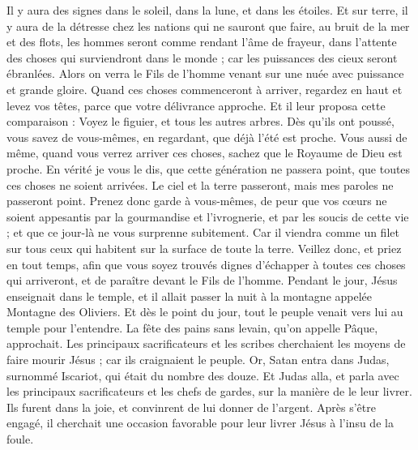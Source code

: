 \begin{multicols}{2}
Il y aura des signes dans le soleil, dans la lune, et dans les étoiles. Et sur terre, il y aura de la détresse chez les nations qui ne sauront que faire, au bruit de la mer et des flots,
les hommes seront comme rendant l'âme de frayeur, dans l'attente des choses qui surviendront dans le monde ; car les puissances des cieux seront ébranlées.
Alors on verra le Fils de l'homme venant sur une nuée avec puissance et grande gloire.
Quand ces choses commenceront à arriver, regardez en haut et levez vos têtes, parce que votre délivrance approche.
Et il leur proposa cette comparaison : Voyez le figuier, et tous les autres arbres.
Dès qu'ils ont poussé, vous savez de vous-mêmes, en regardant, que déjà l'été est proche.
Vous aussi de même, quand vous verrez arriver ces choses, sachez que le Royaume de Dieu est proche.
En vérité je vous le dis, que cette génération ne passera point, que toutes ces choses ne soient arrivées.
Le ciel et la terre passeront, mais mes paroles ne passeront point.
Prenez donc garde à vous-mêmes, de peur que vos cœurs ne soient appesantis par la gourmandise et l'ivrognerie, et par les soucis de cette vie ; et que ce jour-là ne vous surprenne subitement.
Car il viendra comme un filet sur tous ceux qui habitent sur la surface de toute la terre.
Veillez donc, et priez en tout temps, afin que vous soyez trouvés dignes d'échapper à toutes ces choses qui arriveront, et de paraître devant le Fils de l'homme.
Pendant le jour, Jésus enseignait dans le temple, et il allait passer la nuit à la montagne appelée Montagne des Oliviers.
Et dès le point du jour, tout le peuple venait vers lui au temple pour l'entendre.
\VerseOne{}La fête des pains sans levain, qu'on appelle Pâque, approchait.
Les principaux sacrificateurs et les scribes cherchaient les moyens de faire mourir Jésus ; car ils craignaient le peuple.
Or, Satan entra dans Judas, surnommé Iscariot, qui était du nombre des douze.
Et Judas alla, et parla avec les principaux sacrificateurs et les chefs de gardes, sur la manière de le leur livrer.
Ils furent dans la joie, et convinrent de lui donner de l'argent.
Après s'être engagé, il cherchait une occasion favorable pour leur livrer Jésus à l'insu de la foule.

\end{multicols}
